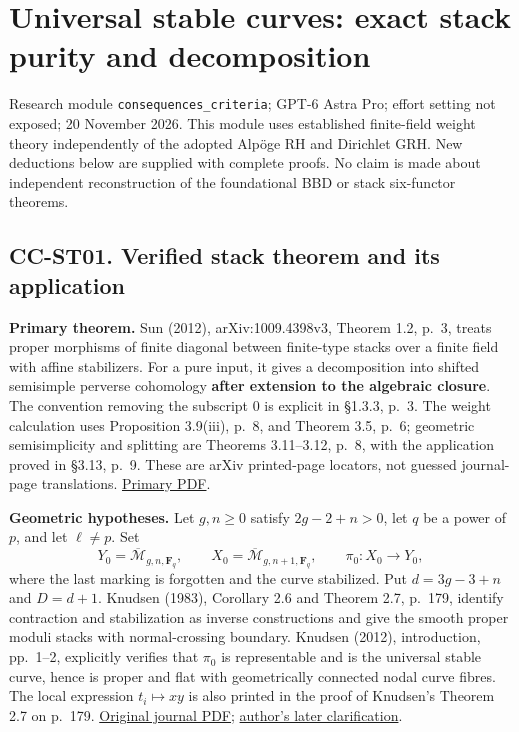 \section{Universal stable curves: exact stack purity and
decomposition}\label{universal-stable-curves-exact-stack-purity-and-decomposition}

Research module \texttt{consequences\_criteria}; GPT-6 Astra Pro; effort
setting not exposed; 20 November 2026. This module uses established
finite-field weight theory independently of the adopted Alpöge RH and
Dirichlet GRH. New deductions below are supplied with complete proofs.
No claim is made about independent reconstruction of the foundational
BBD or stack six-functor theorems.

\subsection{CC-ST01. Verified stack theorem and its
application}\label{cc-st01.-verified-stack-theorem-and-its-application}

\textbf{Primary theorem.} Sun (2012), arXiv:1009.4398v3, Theorem 1.2,
p.~3, treats proper morphisms of finite diagonal between finite-type
stacks over a finite field with affine stabilizers. For a pure input, it
gives a decomposition into shifted semisimple perverse cohomology
\textbf{after extension to the algebraic closure}. The convention
removing the subscript 0 is explicit in §1.3.3, p.~3. The weight
calculation uses Proposition 3.9(iii), p.~8, and Theorem 3.5, p.~6;
geometric semisimplicity and splitting are Theorems 3.11--3.12, p.~8,
with the application proved in §3.13, p.~9. These are arXiv printed-page
locators, not guessed journal-page translations.
\href{https://arxiv.org/pdf/1009.4398v3}{Primary PDF}.

\textbf{Geometric hypotheses.} Let \(g,n\geq0\) satisfy \(2g-2+n>0\),
let \(q\) be a power of \(p\), and let \(\ell\ne p\). Set \[
Y_0=\overline{\mathcal M}_{g,n,\mathbf F_q},\qquad
X_0=\overline{\mathcal M}_{g,n+1,\mathbf F_q},\qquad
\pi_0:X_0\longrightarrow Y_0,
\] where the last marking is forgotten and the curve stabilized. Put
\(d=3g-3+n\) and \(D=d+1\). Knudsen (1983), Corollary 2.6 and Theorem
2.7, p.~179, identify contraction and stabilization as inverse
constructions and give the smooth proper moduli stacks with
normal-crossing boundary. Knudsen (2012), introduction, pp.~1--2,
explicitly verifies that \(\pi_0\) is representable and is the universal
stable curve, hence is proper and flat with geometrically connected
nodal curve fibres. The local expression \(t_i\mapsto xy\) is also
printed in the proof of Knudsen's Theorem 2.7 on p.~179.
\href{https://journals.msp.org/mscand/article/download/1622/1621/1653}{Original
journal PDF}; \href{https://arxiv.org/pdf/1106.1588v2}{author's later
clarification}.

